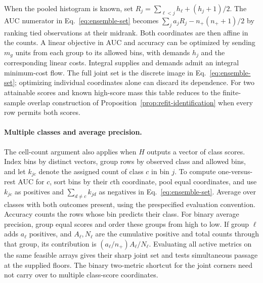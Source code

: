 When the pooled histogram is known, set $R_j=\sum_{\ell<j}h_\ell+(h_j+1)/2$. The AUC numerator in Eq.~\eqref{eq:ensemble-set} becomes $\sum_j a_jR_j-n_+(n_++1)/2$ by ranking tied observations at their midrank. Both coordinates are then affine in the counts. A linear objective in AUC and accuracy can be optimized by sending $m_g$ units from each group to its allowed bins, with demands $h_j$ and the corresponding linear costs. Integral supplies and demands admit an integral minimum-cost flow. The full joint set is the discrete image in Eq.~\eqref{eq:ensemble-set}; optimizing individual coordinates alone can discard its dependence. For two attainable scores and known high-score mass this table reduces to the finite-sample overlap construction of Proposition~\ref{prop:refit-identification} when every row permits both scores.

\paragraph{Multiple classes and average precision.}
The cell-count argument also applies when $H$ outputs a vector of class scores. Index bins by distinct vectors, group rows by observed class and allowed bins, and let $k_{jc}$ denote the assigned count of class $c$ in bin $j$. To compute one-versus-rest AUC for $c$, sort bins by their $c$th coordinate, pool equal coordinates, and use $k_{jc}$ as positives and $\sum_{d\ne c}k_{jd}$ as negatives in Eq.~\eqref{eq:ensemble-set}. Average over classes with both outcomes present, using the prespecified evaluation convention. Accuracy counts the rows whose bin predicts their class. For binary average precision, group equal scores and order these groups from high to low. If group $\ell$ adds $a_\ell$ positives, and $A_\ell,N_\ell$ are the cumulative positive and total counts through that group, its contribution is $(a_\ell/n_+)A_\ell/N_\ell$. Evaluating all active metrics on the same feasible arrays gives their sharp joint set and tests simultaneous passage at the supplied floors. The binary two-metric shortcut for the joint corners need not carry over to multiple class-score coordinates.

